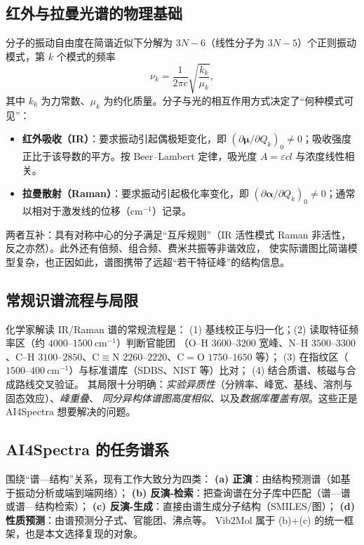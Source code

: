 \documentclass[UTF8,a4paper,11pt]{ctexart}
\begin{document}
\subsection{红外与拉曼光谱的物理基础}
分子的振动自由度在简谐近似下分解为 $3N-6$（线性分子为 $3N-5$）个正则振动模式，第 $k$ 个模式的频率
\begin{equation}
\nu_k=\frac{1}{2\pi c}\sqrt{\frac{k_k}{\mu_k}},
\end{equation}
其中 $k_k$ 为力常数、$\mu_k$ 为约化质量。分子与光的相互作用方式决定了“何种模式可见”：
\begin{itemize}[leftmargin=1.2em,itemsep=1pt]
\item \textbf{红外吸收（IR）}：要求振动引起偶极矩变化，即 $\left(\partial \bm\mu/\partial Q_k\right)_0\neq0$；吸收强度正比于该导数的平方。按 Beer--Lambert 定律，吸光度 $A=\varepsilon c l$ 与浓度线性相关。
\item \textbf{拉曼散射（Raman）}：要求振动引起极化率变化，即 $\left(\partial \bm\alpha/\partial Q_k\right)_0\neq0$；通常以相对于激发线的位移（$\mathrm{cm}^{-1}$）记录。
\end{itemize}
两者互补：具有对称中心的分子满足“互斥规则”（IR 活性模式 Raman 非活性，反之亦然）。此外还有倍频、组合频、费米共振等非谐效应，
使实际谱图比简谐模型复杂，也正因如此，谱图携带了远超“若干特征峰”的结构信息。

\subsection{常规识谱流程与局限}
化学家解读 IR/Raman 谱的常规流程是：
(1) 基线校正与归一化；(2) 读取特征频率区（约 $4000$--$1500\ \mathrm{cm}^{-1}$）判断官能团
（O--H $3600$--$3200$ 宽峰、N--H $3500$--$3300$、C--H $3100$--$2850$、C$\equiv$N $2260$--$2220$、C$=$O $1750$--$1650$ 等）；
(3) 在指纹区（$1500$--$400\ \mathrm{cm}^{-1}$）与标准谱库（SDBS、NIST 等）比对；
(4) 结合质谱、核磁与合成路线交叉验证。
其局限十分明确：\emph{实验异质性}（分辨率、峰宽、基线、溶剂与固态效应）、\emph{峰重叠}、
\emph{同分异构体谱图高度相似}、以及\emph{数据库覆盖有限}。这些正是 AI4Spectra 想要解决的问题。

\subsection{AI4Spectra 的任务谱系}
围绕“谱—结构”关系，现有工作大致分为四类：
\textbf{(a) 正演}：由结构预测谱（如基于振动分析或端到端网络）；
\textbf{(b) 反演-检索}：把查询谱在分子库中匹配（谱—谱或谱—结构检索）；
\textbf{(c) 反演-生成}：直接由谱生成分子结构（SMILES/图）；
\textbf{(d) 性质预测}：由谱预测分子式、官能团、沸点等。
Vib2Mol 属于 (b)+(c) 的统一框架，也是本文选择复现的对象。
\end{document}
